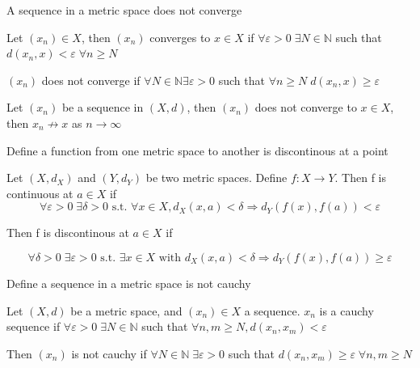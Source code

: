 \documentclass[a4paper,norsk]{article}
\renewcommand{\geq}{\geqslant}
\renewcommand{\epsilon}{\varepsilon}
\begin{document}
\begin{oppgavebox}{A sequence in a metric space does not converge}{}
\begin{proofbox}{}{}
  Let $ \left( x_n \right)  \in  X $, then $ \left( x_n \right)  $ converges to $ x \in X $ if $ \forall \epsilon > 0 \; \exists N \in \mathbb{N} $  such that $ d \left( x_n, x \right) < \epsilon \; \forall n \geq N $ 


  $ \left( x_n \right)  $ does not converge if $ \forall N \in \mathbb{N} \exists \epsilon >0 $ such that $ \forall  n \geq N \; d \left( x_n, x \right) \geq \epsilon  $ 
\end{proofbox}

\begin{proofbox}{}{}
  Let $ \left( x_n \right)  $ be a sequence in $ \left( X, d \right)  $, then $ \left( x_n \right)   $ does not converge to $ x \in X $, then $ x_n \not \to x $ as $ n \to \infty $  
\end{proofbox}
\end{oppgavebox}

\begin{oppgavebox}{Define a function from one metric space to another is discontinous at a point}{}

\begin{proofbox}{}{}
  Let $ \left( X, d_X \right)  $ and $ \left( Y, d_Y \right)  $ be two metric spaces. Define $ f : X \to Y $. Then f is continuous at $ a \in X $ if
  \[
      \forall \epsilon > 0 \; \exists \delta > 0 \text{ s.t. } \forall x \in X, d_X \left( x, a \right) < \delta \Rightarrow d_Y \left( f(x), f(a) \right) < \epsilon  
  \]


  Then f is discontinous at $ a \in X $ if 

  \[
      \forall \delta > 0 \; \exists \epsilon > 0 \text{ s.t. } \exists x \in X \text{ with } d_X \left( x, a \right) < \delta   \Rightarrow d_Y \left( f(x), f(a) \right) \geq \epsilon 
  \]
  
  
\end{proofbox}
\end{oppgavebox}

\begin{oppgavebox}{Define a sequence in a metric space is not cauchy}{}
\begin{proofbox}{}{}
  Let $ \left( X, d \right)  $ be a metric space, and $ \left( x_n \right) \in X $ a sequence. $ x_n $ is a cauchy sequence if $ \forall \epsilon > 0 \; \exists N \in \mathbb{N} $ such that $ \forall n, m \geq N, d \left( x_n, x_m \right) < \epsilon  $
  
  
  Then $ \left( x_n \right)  $ is not cauchy if $ \forall N \in \mathbb{N} \; \exists \epsilon > 0 $ such that $ d \left( x_n, x_m \right) \geq \epsilon \; \forall  n, m \geq N $   
\end{proofbox}
\end{oppgavebox}
\end{document}
